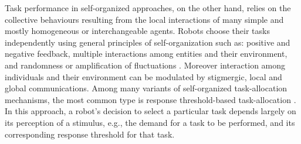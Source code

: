 \documentclass[journal]{IEEEtran}
\begin{document}
Task performance in self-organized approaches, on the other hand, relies on the collective behaviours resulting from the local interactions of many simple and mostly homogeneous or interchangeable agents. Robots choose their tasks independently using general principles of self-organization such as: positive and negative feedback, multiple interactions among entities and their environment, and randomness or amplification of fluctuations \cite{Camazine+2001}. Moreover interaction among individuals and their environment can be modulated by stigmergic, local and global communications.  Among many variants of self-organized task-allocation mechanisms, the most common type is response threshold-based task-allocation \cite{Bonabeau+1999}. In this approach, a robot's decision to select a particular task depends largely on its perception of a stimulus, e.g., the demand for a task to be performed, and its corresponding response threshold for that task.
\end{document}

